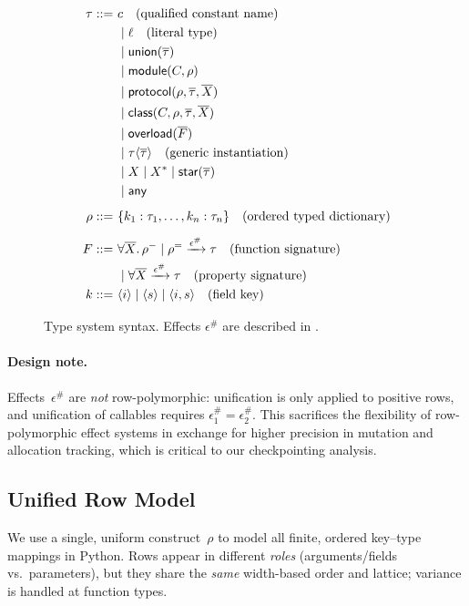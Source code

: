 \begin{figure}[t]
\centering
\begin{align*}
\tau ::=~& c \quad\text{(qualified constant name)} \\
 & \mid \ell \quad\text{(literal type)} \\
 & \mid \mathsf{union}(\overline{\tau}) \\
 & \mid \mathsf{module}(C, \mathord{\rho}) \\
 & \mid \mathsf{protocol}(\mathord{\rho}, \overline{\tau}, \overline{X}) \\
 & \mid \mathsf{class}(C, \mathord{\rho}, \overline{\tau}, \overline{X}) \\
 & \mid \mathsf{overload}(\overline{F}) \\
 & \mid \tau\langle\overline{\tau}\rangle \quad\text{(generic instantiation)} \\
 & \mid X \mid X^* \mid \mathsf{star}(\overline{\tau}) \\
 & \mid \mathsf{any}
\\[0.5em]
\mathord{\rho} ::=~& \{ k_1 : \tau_1, \ldots, k_n : \tau_n \} \quad\text{(ordered typed dictionary)}
\\[0.5em]
F ::=~& \forall \overline{X}.\,\mathord{\rho^{-}} \mid \mathord{\rho^{=}} \xrightarrow{\epsilon^\#} \tau
\quad\text{(function signature)}\\
 & \mid \forall \overline{X}\xrightarrow{\epsilon^\#} \tau \quad\text{(property signature)}
\\
k ::=~& \langle i\rangle \mid \langle s\rangle \mid \langle i, s\rangle
\quad\text{(field key)}
\end{align*}
\caption{Type system syntax. Effects $\epsilon^\#$ are described in .}
\label{fig:type-syntax}
\end{figure}

\paragraph{Design note.}
Effects~$\epsilon^\#$ are \emph{not} row-polymorphic: unification is only applied to positive rows, and unification of callables requires $\epsilon^\#_1 = \epsilon^\#_2$.  
This sacrifices the flexibility of row-polymorphic effect systems in exchange for higher precision in mutation and allocation tracking, which is critical to our checkpointing analysis.

\subsection{Unified Row Model}
\label{sec:unified-record}
We use a single, uniform construct~$\rho$ to model all finite, ordered key--type mappings in Python.
Rows appear in different \emph{roles} (arguments/fields vs.\ parameters), but they share the \emph{same} width-based order and lattice; variance is handled at function types.

